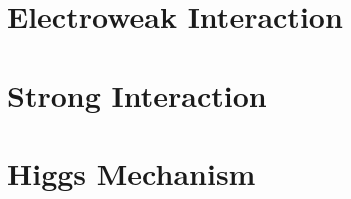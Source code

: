\section{Electroweak Interaction}
\label{sec:electroweak_interaction}
\section{Strong Interaction}
\label{sec:strong_interaction}
\section{Higgs Mechanism}
\label{sec:higgs_mechanism}

